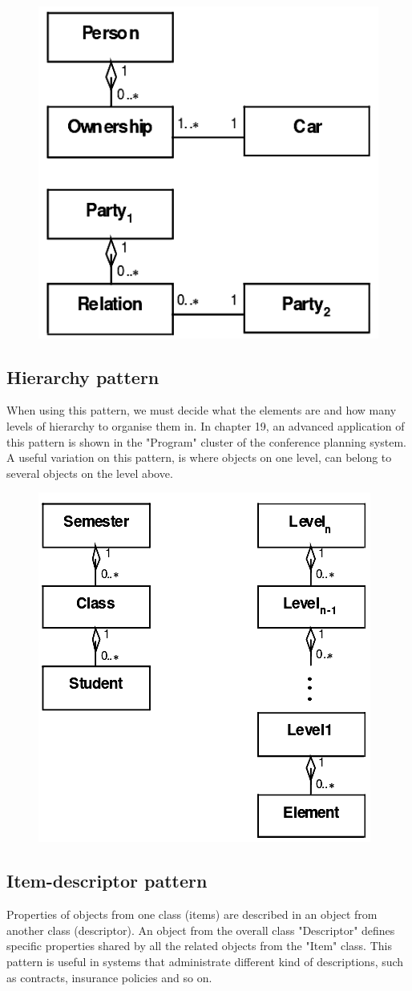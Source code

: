 \begin{figure}[H]
    \centering
    \includegraphics[width=.35\textwidth]{figures/relationpattern.png}
\end{figure}

\subsection{Hierarchy pattern}
When using this pattern, we must decide what the elements are and how many levels of hierarchy to organise them in. In chapter 19, an advanced application of this pattern is shown in the "Program" cluster of the conference planning system. A useful variation on this pattern, is where objects on one level, can belong to several objects on the level above. 

\begin{figure}[H]
    \centering
    \includegraphics[width=.4\textwidth]{figures/hierachypattern.png}
\end{figure}

\subsection{Item-descriptor pattern}
Properties of objects from one class (items) are described in an object from another class (descriptor). An object from the overall class "Descriptor" defines specific properties shared by all the related objects from the "Item" class. This pattern is useful in systems that administrate different kind of descriptions, such as contracts, insurance policies and so on.

